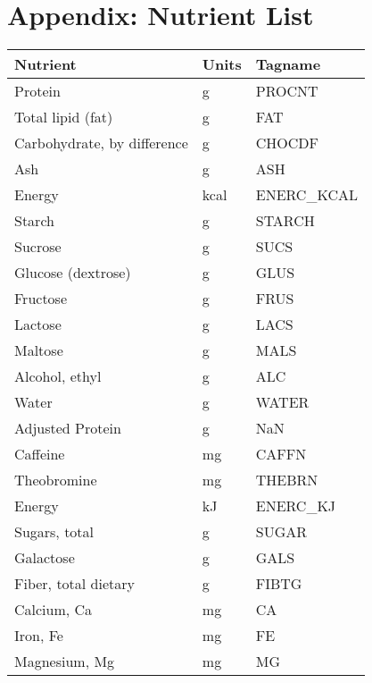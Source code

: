 \documentclass[]{scrartcl}
\begin{document}
\part*{Appendix:  Nutrient List}
\begin{longtable}{lll}
	\textbf{Nutrient} & \textbf{Units} &     \textbf{Tagname} \\
	\hline
	Protein                            &     g &      PROCNT \\
	Total lipid (fat)                  &     g &         FAT \\
	Carbohydrate, by difference        &     g &      CHOCDF \\
	Ash                                &     g &         ASH \\
	Energy                             &  kcal &  ENERC\_KCAL \\
	Starch                             &     g &      STARCH \\
	Sucrose                            &     g &        SUCS \\
	Glucose (dextrose)                 &     g &        GLUS \\
	Fructose                           &     g &        FRUS \\
	Lactose                            &     g &        LACS \\
	Maltose                            &     g &        MALS \\
	Alcohol, ethyl                     &     g &         ALC \\
	Water                              &     g &       WATER \\
	Adjusted Protein                   &     g &         NaN \\
	Caffeine                           &    mg &       CAFFN \\
	Theobromine                        &    mg &      THEBRN \\
	Energy                             &    kJ &    ENERC\_KJ \\
	Sugars, total                      &     g &       SUGAR \\
	Galactose                          &     g &        GALS \\
	Fiber, total dietary               &     g &       FIBTG \\
	Calcium, Ca                        &    mg &          CA \\
	Iron, Fe                           &    mg &          FE \\
	Magnesium, Mg                      &    mg &          MG \\

\end{longtable}
\end{document}
